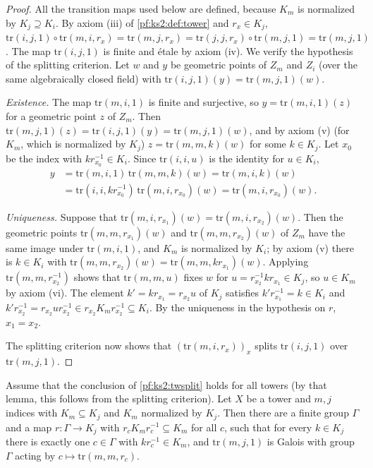 \begin{proof}
All the transition maps used below are defined, because $K_m$ is normalized by $K_j\supseteq K_i$.
By axiom (iii) of \cref{pf:ks2:def:tower} and $r_x\in K_j$,
$\mathrm{tr}(i,j,1)\circ\mathrm{tr}(m,i,r_x)=\mathrm{tr}(m,j,r_x)=\mathrm{tr}(j,j,r_x)\circ
\mathrm{tr}(m,j,1)=\mathrm{tr}(m,j,1)$. The map $\mathrm{tr}(i,j,1)$ is finite and \'etale by axiom
(iv). We verify the hypothesis of the splitting criterion. Let $w$ and $y$ be geometric points of
$Z_m$ and $Z_i$ (over the same algebraically closed field) with
$\mathrm{tr}(i,j,1)(y)=\mathrm{tr}(m,j,1)(w)$.

\emph{Existence.} The map $\mathrm{tr}(m,i,1)$ is finite and surjective, so
$y=\mathrm{tr}(m,i,1)(z)$ for a geometric point $z$ of $Z_m$. Then
$\mathrm{tr}(m,j,1)(z)=\mathrm{tr}(i,j,1)(y)=\mathrm{tr}(m,j,1)(w)$, and by axiom (v) (for $K_m$,
which is normalized by $K_j$) $z=\mathrm{tr}(m,m,k)(w)$ for some $k\in K_j$. Let $x_0$ be the index
with $kr_{x_0}^{-1}\in K_i$. Since $\mathrm{tr}(i,i,u)$ is the identity for $u\in K_i$,
\begin{align*}
y&=\mathrm{tr}(m,i,1)\,\mathrm{tr}(m,m,k)(w)=\mathrm{tr}(m,i,k)(w)\\
&=\mathrm{tr}(i,i,kr_{x_0}^{-1})\,\mathrm{tr}(m,i,r_{x_0})(w)=\mathrm{tr}(m,i,r_{x_0})(w).
\end{align*}

\emph{Uniqueness.} Suppose that $\mathrm{tr}(m,i,r_{x_1})(w)=\mathrm{tr}(m,i,r_{x_2})(w)$. Then the
geometric points $\mathrm{tr}(m,m,r_{x_1})(w)$ and $\mathrm{tr}(m,m,r_{x_2})(w)$ of $Z_m$ have the same
image under $\mathrm{tr}(m,i,1)$, and $K_m$ is normalized by $K_i$; by axiom (v) there is $k\in K_i$
with $\mathrm{tr}(m,m,r_{x_2})(w)=\mathrm{tr}(m,m,kr_{x_1})(w)$. Applying $\mathrm{tr}(m,m,r_{x_2}^{-1})$
shows that $\mathrm{tr}(m,m,u)$ fixes $w$ for $u=r_{x_2}^{-1}kr_{x_1}\in K_j$, so $u\in K_m$ by axiom
(vi). The element $k'=kr_{x_1}=r_{x_2}u$ of $K_j$ satisfies $k'r_{x_1}^{-1}=k\in K_i$ and
$k'r_{x_2}^{-1}=r_{x_2}ur_{x_2}^{-1}\in r_{x_2}K_mr_{x_2}^{-1}\subseteq K_i$. By the uniqueness in the
hypothesis on $r$, $x_1=x_2$.

The splitting criterion now shows that $(\mathrm{tr}(m,i,r_x))_x$ splits $\mathrm{tr}(i,j,1)$ over
$\mathrm{tr}(m,j,1)$.
\end{proof}

\begin{lemma}\label{pf:ks2:twgal}
Assume that the conclusion of \cref{pf:ks2:twsplit} holds for all towers (by that lemma, this
follows from the splitting criterion). Let $X$ be a tower and $m,j$ indices with $K_m\subseteq K_j$
and $K_m$ normalized by $K_j$. Then there are a finite group $\Gamma$ and a map $r\colon\Gamma\to K_j$
with $r_cK_mr_c^{-1}\subseteq K_m$ for all $c$, such that for every $k\in K_j$ there is exactly one
$c\in\Gamma$ with $kr_c^{-1}\in K_m$, and $\mathrm{tr}(m,j,1)$ is Galois with group $\Gamma$ acting by
$c\mapsto\mathrm{tr}(m,m,r_c)$.
\end{lemma}

